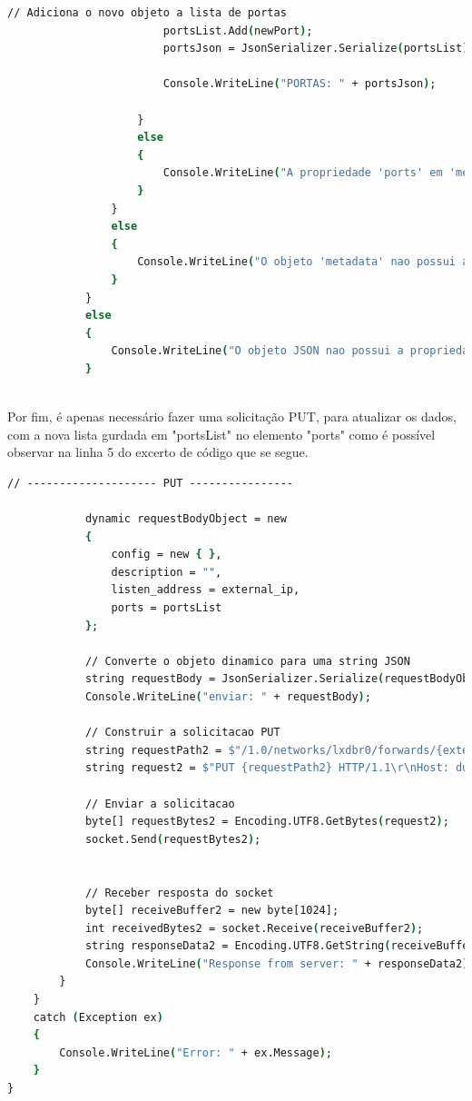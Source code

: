 \begin{lstlisting}[language=csh, caption={Editar o conteúdo Json}]
                        // Adiciona o novo objeto a lista de portas
                        portsList.Add(newPort);
                        portsJson = JsonSerializer.Serialize(portsList);

                        Console.WriteLine("PORTAS: " + portsJson);

                    }
                    else
                    {
                        Console.WriteLine("A propriedade 'ports' em 'metadata' nao e um array.");
                    }
                }
                else
                {
                    Console.WriteLine("O objeto 'metadata' nao possui a propriedade 'ports'.");
                }
            }
            else
            {
                Console.WriteLine("O objeto JSON nao possui a propriedade 'metadata' ou e nulo.");
            }
        

\end{lstlisting}   


Por fim, é apenas necessário fazer uma solicitação PUT, para atualizar os dados, com a nova 
lista gurdada em "portsList" no elemento "ports" como é possível observar
na linha 5 do excerto de código que se segue.

\begin{lstlisting}[language=csh, caption={Fazer solicitação PUT com os novos dados}]
            // -------------------- PUT ----------------

            dynamic requestBodyObject = new
            {
                config = new { },
                description = "",
                listen_address = external_ip,
                ports = portsList
            };

            // Converte o objeto dinamico para uma string JSON
            string requestBody = JsonSerializer.Serialize(requestBodyObject);
            Console.WriteLine("enviar: " + requestBody);

            // Construir a solicitacao PUT
            string requestPath2 = $"/1.0/networks/lxdbr0/forwards/{external_ip}";
            string request2 = $"PUT {requestPath2} HTTP/1.1\r\nHost: dummy\r\nContent-Length: {Encoding.UTF8.GetBytes(requestBody).Length}\r\n\r\n{requestBody}";

            // Enviar a solicitacao
            byte[] requestBytes2 = Encoding.UTF8.GetBytes(request2);
            socket.Send(requestBytes2);


            // Receber resposta do socket
            byte[] receiveBuffer2 = new byte[1024];
            int receivedBytes2 = socket.Receive(receiveBuffer2);
            string responseData2 = Encoding.UTF8.GetString(receiveBuffer2, 0, receivedBytes2);
            Console.WriteLine("Response from server: " + responseData2);
        }
    }
    catch (Exception ex)
    {
        Console.WriteLine("Error: " + ex.Message);
    }
}
\end{lstlisting} 



